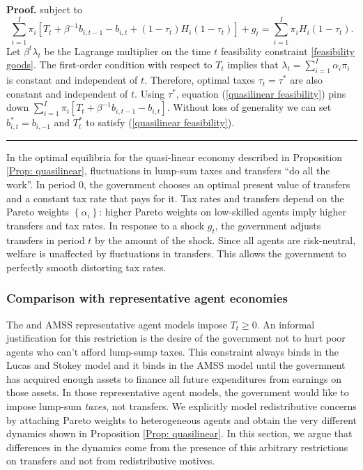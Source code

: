 \documentclass[thmsb,11pt]{article}
\newenvironment{proof}[1][Proof]{\noindent \textbf{#1.} }{\  \rule{0.5em}{0.5em}}
\begin{document}
\begin{proof}
subject to
\begin{equation}
\sum_{i=1}^{I}\pi _{i}\left[ T_{t}+\beta ^{-1}b_{i,t-1}-b_{i,t}+\left(
1-\tau _{t}\right) H_{i}\left( 1-\tau _{t}\right) \right] +g_{t}=%
\sum_{i=1}^{I}\pi _{i}H_{i}\left( 1-\tau _{t}\right) .
\label{quasilinear feasibility}
\end{equation}%
Let $\beta ^{t}\lambda _{t}$ be the Lagrange multiplier on the time $t$
feasibility constraint \eqref{feasibility goods}. The first-order condition with respect to $T_{t}$
implies that $\lambda _{t}=\sum_{i=1}^{I}\alpha _{i}\pi _{i}$ is constant
and independent of $t.$ Therefore, optimal taxes $\tau _{t}=\tau^{\ast }$ are
also constant and independent of $t.$  Using $\tau^{\ast}$, equation (\ref{quasilinear feasibility}) pins down $\sum_{i=1}^{I}\pi _{i}\left[ T_{t}+\beta ^{-1}b_{i,t-1}-b_{i,t}\right]$. Without loss of generality we can set $b^*_{i,t}=b_{i,-1}$ and $T^*_t$ to satisfy  (\ref{quasilinear feasibility}). %
\end{proof}

\smallskip In the optimal equilibria for the quasi-linear economy described in Proposition \ref{Prop: quasilinear}, fluctuations in lump-sum taxes and
transfers ``do all the work''. In period 0, the government chooses an optimal
present value of transfers and a constant tax rate that pays for it. Tax rates  and transfers depend on the Pareto weights $\left\{ \alpha
_{i}\right\} $:  higher Pareto weights on low-skilled agents imply
higher transfers and tax rates. In response to a shock $g_{t}$, the
government adjusts transfers in period $t$ by the amount of the shock. Since
all agents are risk-neutral,  welfare is unaffected by
fluctuations in transfers. This allows the government  to  perfectly smooth distorting tax rates.

\smallskip

\subsubsection{Comparison with representative agent economies} \label{sec: comp with AMSS}

The \cite{LucasJr.1983} and AMSS representative agent models
impose $T_{t}\geq 0$. An informal justification for this restriction is the desire of the government  not to hurt poor agents who can't afford lump-sump taxes.  This constraint always binds in the Lucas and Stokey
model and it binds in the AMSS model  until the government has acquired enough
assets to finance all future expenditures from earnings on those assets. In those
representative agent models, the government would like to impose lump-sum \emph{taxes}, not
transfers. We explicitly model redistributive concerns by attaching Pareto weights to heterogeneous agents and obtain the very different dynamics shown in Proposition \ref{Prop: quasilinear}. In this section, we argue that  differences in the dynamics come from the presence of this arbitrary restrictions on transfers and not from redistributive motives.
\end{document}
